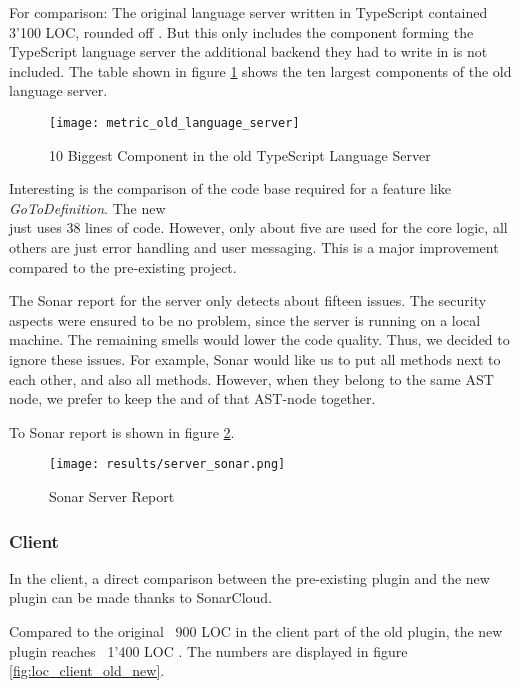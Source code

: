 For comparison: The original language server written in TypeScript contained 3'100 LOC, rounded off \cite{sonar-old_ts_server}.
But this only includes the component forming the TypeScript language server \textendash{} the additional backend they had to write in \Csharp is not included.
The table shown in figure \ref{fig:old_ts_languageserver} shows the ten largest components of the old language server. \\

\begin{figure}[H]
    \centering
    \texttt{[image: metric\_old\_language\_server]}
    \caption{10 Biggest Component in the old TypeScript Language Server}
    \label{fig:old_ts_languageserver}
\end{figure}

Interesting is the comparison of the code base required for a feature like \textit{GoToDefinition}.
The new \\
 just uses 38 lines of code.
However, only about five are used for the core logic, all others are just error handling and user messaging.
This is a major improvement compared to the pre-existing project.

The Sonar report for the server only detects about fifteen issues.
The security aspects were ensured to be no problem, since the server is running on a local machine.
The remaining smells would lower the code quality.
Thus, we decided to ignore these issues.
For example, Sonar would like us to put all  methods next to each other, and also all  methods.
However, when they belong to the same AST node, we prefer to keep the  and  of that AST-node together.

To Sonar report is shown in figure \ref{fig:sonarserver}.

\begin{figure}[H]
    \centering
    \texttt{[image: results/server\_sonar.png]}
    \caption{Sonar Server Report}
    \label{fig:sonarserver}
\end{figure}


\subsubsection{Client}
In the client, a direct comparison between the pre-existing plugin and the new plugin can be made thanks to SonarCloud.

Compared to the original ~900 LOC \cite{sonar-client_old} in the client part of the old plugin,
the new plugin reaches ~1'400 LOC \cite{sonar-client_new}.
The numbers are displayed in figure \ref{fig:loc_client_old_new}.

